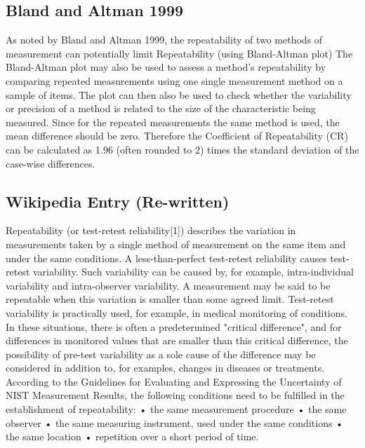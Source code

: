 \subsection{Bland and Altman 1999}
As noted by Bland and Altman 1999, the repeatability of two methods of measurement can  potentially limit
Repeatability (using Bland-Altman plot)
The Bland-Altman plot may also be used to assess a method’s repeatability by comparing repeated measurements using one single measurement method on a sample of items.
The plot can then also be used to check whether the variability or precision of a method is related to the size of the characteristic being measured.
Since for the repeated measurements the same method is used, the mean difference should be zero.
Therefore the Coefficient of Repeatability (CR) can be calculated as 1.96 (often rounded to 2) times the standard deviation of the case-wise differences.
\subsection{Wikipedia Entry (Re-written)}
Repeatability (or test-retest reliability[1])  describes the variation in measurements taken by a single method of measurement on the same item and under the same conditions. 
A less-than-perfect test-retest reliability causes test-retest variability. Such variability can be caused by, for example, intra-individual variability and intra-observer variability. 
A measurement may be said to be repeatable when this variation is smaller than some agreed limit.
Test-retest variability is practically used, for example, in medical monitoring of conditions. In these situations, there is often a predetermined "critical difference", and for differences in monitored values that are smaller than this critical difference, the possibility of pre-test variability as a sole cause of the difference may be considered in addition to, for examples, changes in diseases or treatments.
According to the Guidelines for Evaluating and Expressing the Uncertainty of NIST Measurement Results, the following conditions need to be fulfilled in the establishment of repeatability:
•	the same measurement procedure
•	the same observer
•	the same measuring instrument, used under the same conditions
•	the same location
•	repetition over a short period of time.
